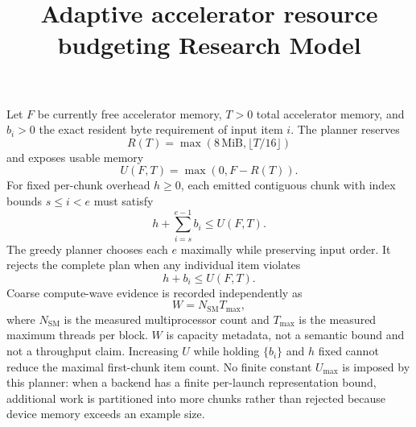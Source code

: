 \documentclass{article}
\title{Adaptive accelerator resource budgeting Research Model}
\begin{document}
\maketitle
Let $F$ be currently free accelerator memory, $T>0$ total accelerator
memory, and $b_i>0$ the exact resident byte requirement of input item $i$. The
planner reserves
\[
  R(T)=\max(8\,\mathrm{MiB},\lfloor T/16\rfloor)
\]
and exposes usable memory
\[
  U(F,T)=\max(0,F-R(T)).
\]
For fixed per-chunk overhead $h\ge 0$, each emitted contiguous chunk
with index bounds $s\leq i<e$ must satisfy
\[
  h+\sum_{i=s}^{e-1} b_i \le U(F,T).
\]
The greedy planner chooses each $e$ maximally while preserving input order. It
rejects the complete plan when any individual item violates
\[
  h+b_i \le U(F,T).
\]
Coarse compute-wave evidence is recorded independently as
\[
  W = N_{\mathrm{SM}} T_{\max},
\]
where $N_{\mathrm{SM}}$ is the measured multiprocessor count and $T_{\max}$
is the measured maximum threads per block. $W$ is capacity metadata, not a
semantic bound and not a throughput claim. Increasing $U$ while holding
$\{b_i\}$ and $h$ fixed cannot reduce the maximal first-chunk item count. No
finite constant $U_{\max}$ is imposed by this planner: when a backend has a
finite per-launch representation bound, additional work is partitioned into more
chunks rather than rejected because device memory exceeds an example size.
\end{document}
